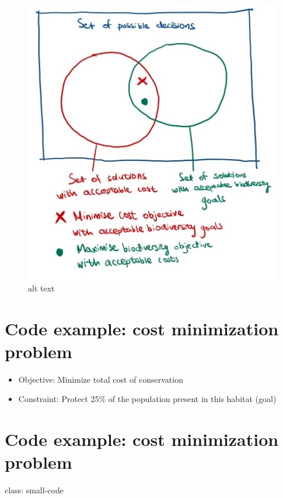 \documentclass[
]{article}
\providecommand{\tightlist}{%
  \setlength{\itemsep}{0pt}\setlength{\parskip}{0pt}}
\begin{document}
\begin{figure}
\centering
\includegraphics{images/Systematic Conservation Planning -2.jpeg}
\caption{alt text}
\end{figure}

\hypertarget{code-example-cost-minimization-problem}{%
\section{Code example: cost minimization
problem}\label{code-example-cost-minimization-problem}}

\begin{itemize}
\tightlist
\item
  Objective: Minimize total cost of conservation
\item
  Constraint: Protect 25\% of the population present in this habitat
  (goal)
\end{itemize}

\hypertarget{code-example-cost-minimization-problem-1}{%
\section{Code example: cost minimization
problem}\label{code-example-cost-minimization-problem-1}}

class: small-code
\end{document}
